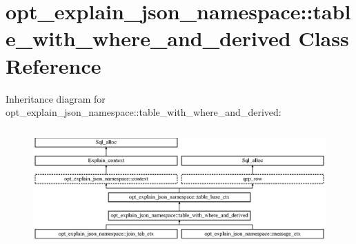 \hypertarget{classopt__explain__json__namespace_1_1table__with__where__and__derived}{}\section{opt\+\_\+explain\+\_\+json\+\_\+namespace\+:\+:table\+\_\+with\+\_\+where\+\_\+and\+\_\+derived Class Reference}
\label{classopt__explain__json__namespace_1_1table__with__where__and__derived}
Inheritance diagram for opt\+\_\+explain\+\_\+json\+\_\+namespace\+:\+:table\+\_\+with\+\_\+where\+\_\+and\+\_\+derived\+:\begin{figure}[H]
\begin{center}
\leavevmode
\includegraphics[height=4.577657cm]{classopt__explain__json__namespace_1_1table__with__where__and__derived}
\end{center}
\end{figure}
